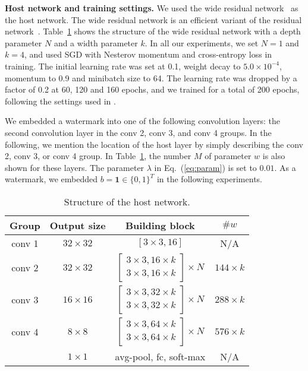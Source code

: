 \documentclass[10pt,twocolumn,letterpaper]{article}
\begin{document}
\textbf{Host network and training settings.}
We used the wide residual network~\cite{zag_eccv16} as the host network.
The wide residual network is an efficient variant of the residual network~\cite{He_cvpr16}.
Table~\ref{tab:network} shows the structure of the wide residual network with a depth parameter $N$ and a width parameter $k$.
In all our experiments, we set $N = 1$ and $k = 4$, and used SGD with Nesterov momentum and cross-entropy loss in training.
The initial learning rate was set at 0.1, weight decay to $5.0{\times}10^{-4}$, momentum to 0.9 and minibatch size to 64.
The learning rate was dropped by a factor of 0.2 at 60, 120 and 160 epochs, and we trained for a total of 200 epochs, following the settings used in \cite{zag_eccv16}.

We embedded a watermark into one of the following convolution layers: the second convolution layer in the \textsf{conv 2}, \textsf{conv 3}, and \textsf{conv 4} groups.
In the following, we mention the location of the host layer by simply describing the \textsf{conv 2}, \textsf{conv 3}, or \textsf{conv 4} group.
In Table~\ref{tab:network}, the number $M$ of parameter $w$ is also shown for these layers.
The parameter $\lambda$ in Eq.~(\ref{eq:param}) is set to $0.01$.
As a watermark, we embedded $b = \mathbf{1} \in \{0, 1\}^{T}$ in the following experiments.



\begin{table}[tb]
	\centering
	\caption{Structure of the host network.}
	\label{tab:network}
	\begin{tabular}{c|c|c|c} \hline
Group	& Output size	& Building block	& $\#w$	\\ \hline
conv 1	& $32 \times 32$	& $[3 \times 3, 16]$	& N/A	\\
conv 2	& $32 \times 32$	& $\begin{bmatrix} 3 \times 3, 16 \times k
\\ 3 \times 3, 16 \times k \end{bmatrix} \times N$	& $144 \times k$	\\
conv 3	& $16 \times 16$	& $\begin{bmatrix} 3 \times 3, 32 \times k
\\ 3 \times 3, 32 \times k \end{bmatrix} \times N$	& $288 \times k$	\\
conv 4	& $8 \times 8$	& $\begin{bmatrix} 3 \times 3, 64 \times k
\\ 3 \times 3, 64 \times k \end{bmatrix} \times N$	& $576 \times k$	\\
			& $1 \times 1$	& avg-pool, fc, soft-max	& N/A \\ \hline
	\end{tabular} \\
\end{table}
\end{document}
